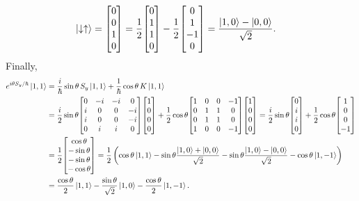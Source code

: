\begin{solution}
\begin{align*}
		\kdu &= \mqty[ 0 \\ 0 \\ 1 \\ 0 ] = \frac{1}{2} \mqty[ 0 \\ 1 \\ 1 \\ 0 ] - \frac{1}{2} \mqty[ 0 \\ 1 \\ -1 \\ 0 ] = \frac{\kqo - \koo}{\sqrt{2}}.
	\end{align*}
	Finally,
	\begin{align*}
		\eitsyh \kqq &= \frac{i}{\hbar} \sint \, \Sy \kqq + \frac{1}{\hbar} \cost \, K \kqq \\
		&= \frac{i}{2} \sint \mqty[ 0 & -i & -i & 0 \\ i & 0 & 0 & -i \\ i & 0 & 0 & -i \\ 0 & i & i & 0 ] \mqty[ 1 \\ 0 \\ 0 \\ 0 ] + \frac{1}{2} \cost \mqty[ 1 & 0 & 0 & -1 \\ 0 & 1 & 1 & 0 \\ 0 & 1 & 1 & 0 \\ 1 & 0 & 0 & -1 ] \mqty[ 1 \\ 0 \\ 0 \\ 0 ] = \frac{i}{2} \sint \mqty[ 0 \\ i \\ i \\ 0 ] + \frac{1}{2} \cost \mqty[ 1 \\ 0 \\ 0 \\ -1 ] \\
		&= \frac{1}{2} \mqty[ \cost \\ -\sint \\ -\sint \\ -\cost ]
		= \frac{1}{2} \left( \cost \kqq - \sint \frac{\kqo + \koo}{\sqrt{2}} - \sint \frac{\kqo - \koo}{\sqrt{2}} - \cost \kqnq \right) \\
		&= \frac{\cost}{2} \kqq - \frac{\sint}{\sqrt{2}} \kqo - \frac{\cost}{2} \kqnq.
	\end{align*}
\vfix
\end{solution}